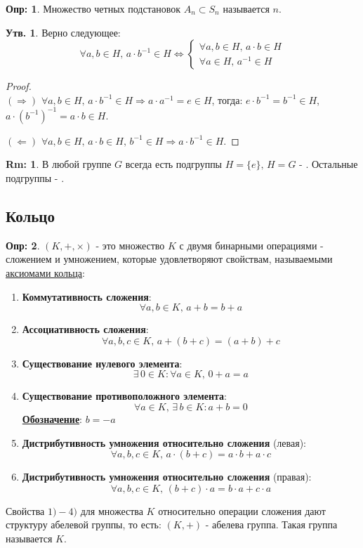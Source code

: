 \documentclass[12pt]{article}
\theoremstyle{definition}
\newtheorem{defn}{Опр:}
\newtheorem{rem}{Rm:}
\newtheorem{prop}{Утв.}
\begin{document}
\begin{defn}
	Множество четных подстановок $A_n \subset S_n$ называется  $n$.
\end{defn}

\begin{prop}
	Верно следующее:
	$$
		\forall a,b \in H, \, a{\cdot}b^{-1} \in H \Leftrightarrow 
		\begin{cases}
			\forall a,b \in H, \, a{\cdot}b \in H \\
			\forall a \in H, \, a^{-1} \in H
		\end{cases}
	$$
\end{prop}
\begin{proof}\hfill\\
	$(\Rightarrow)$ $\forall a,b \in H, \, a{\cdot}b^{-1} \in H \Rightarrow a{\cdot}a^{-1} = e \in H$, тогда: $e{\cdot}b^{-1} = b^{-1} \in H$, $a{\cdot}(b^{-1})^{-1} = a{\cdot}b \in H$.
	
	$(\Leftarrow)$ $\forall a,b \in H, \, a{\cdot}b \in H, \, b^{-1} \in H \Rightarrow a{\cdot}b^{-1} \in H$.
\end{proof}

\begin{rem}
	В любой группе $G$ всегда есть подгруппы $H = \{e\}, \, H = G$ - . Остальные подгруппы - .
\end{rem}

\subsection*{Кольцо}

\begin{defn}
	 $(K,+,\times)$ - это множество $K$ с двумя бинарными операциями - сложением и умножением, которые удовлетворяют свойствам, называемыми \uline{аксиомами кольца}:
	\begin{enumerate}[label=\arabic*)]
		\item \textbf{Коммутативность сложения}:
		$$
			\forall a,b \in K, \, a + b = b + a
		$$
		\item \textbf{Ассоциативность сложения}:
		$$
			\forall a,b,c \in K, \, a + (b + c) = (a + b) + c
		$$
		\item \textbf{Существование нулевого элемента}:
		$$
			\exists \, 0 \in K \colon \forall a \in K, \, 0 + a = a
		$$
		\item \textbf{Существование противоположного элемента}:
		$$
			\forall a \in K, \, \exists \, b \in K \colon a + b =0
		$$
		\textbf{\uline{Обозначение}}: $b = -a$
		\item \textbf{Дистрибутивность умножения относительно сложения} (левая):
		$$
			\forall a,b,c \in K, \, a{\cdot}(b + c) = a{\cdot}b + a{\cdot}c
		$$
		\item \textbf{Дистрибутивность умножения относительно сложения} (правая):
		$$
			\forall a,b,c \in K, \, (b + c){\cdot}a = b{\cdot}a + c{\cdot}a
		$$
	\end{enumerate}
	Свойства $1) - 4)$ для множества $K$ относительно операции сложения дают структуру абелевой группы, то есть: $(K,+)$ - абелева группа. Такая группа называется  $K$.
\end{defn}
\end{document}
